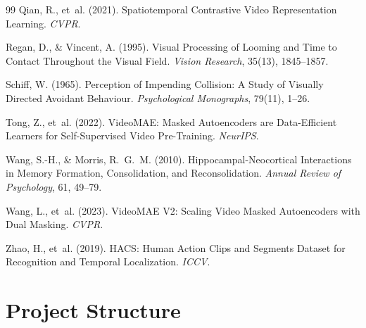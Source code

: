 \documentclass[11pt]{article}
\begin{document}
\begin{thebibliography}{99}
Qian, R., et~al. (2021).
\newblock Spatiotemporal Contrastive Video Representation Learning.
\newblock \emph{CVPR}.

Regan, D., \& Vincent, A. (1995).
\newblock Visual Processing of Looming and Time to Contact Throughout the Visual Field.
\newblock \emph{Vision Research}, 35(13), 1845--1857.

Schiff, W. (1965).
\newblock Perception of Impending Collision: A Study of Visually Directed Avoidant Behaviour.
\newblock \emph{Psychological Monographs}, 79(11), 1--26.

Tong, Z., et~al. (2022).
\newblock VideoMAE: Masked Autoencoders are Data-Efficient Learners for Self-Supervised Video Pre-Training.
\newblock \emph{NeurIPS}.

Wang, S.-H., \& Morris, R.~G.~M. (2010).
\newblock Hippocampal-Neocortical Interactions in Memory Formation, Consolidation, and Reconsolidation.
\newblock \emph{Annual Review of Psychology}, 61, 49--79.

Wang, L., et~al. (2023).
\newblock VideoMAE V2: Scaling Video Masked Autoencoders with Dual Masking.
\newblock \emph{CVPR}.

Zhao, H., et~al. (2019).
\newblock HACS: Human Action Clips and Segments Dataset for Recognition and Temporal Localization.
\newblock \emph{ICCV}.

\end{thebibliography}

\appendix

\section{Project Structure}
\end{document}
